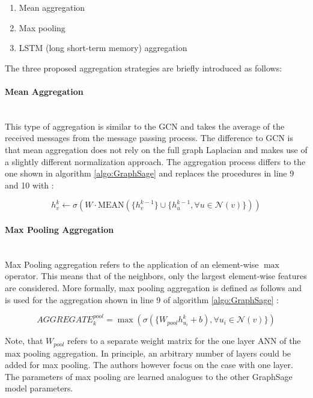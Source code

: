 	\begin{enumerate}
		\setlength\itemsep{0.2em}
		\item Mean aggregation
		\item Max pooling
		\item LSTM (long short-term memory) aggregation
	\end{enumerate}

	\noindent The three proposed aggregation strategies are briefly introduced
	as follows:

	\paragraph{Mean Aggregation} \mbox{}\\
	\noindent This type of aggregation is similar to the GCN and takes the
	average of the received messages from the message passing process. The 
	difference to GCN is that mean aggregation does not rely on the full graph 
	Laplacian and makes use of a slightly different normalization approach. The 
	aggregation process differs to the one shown in algorithm 
	\ref{algo:GraphSage} and replaces the procedures in line 9 and 10 with 
	\citep[p. 5]{hamilton2017inductive}:

	\begin{equation}
		h_{v}^{k} \leftarrow \sigma\left(W\cdot
		\text{MEAN}(\{h_{v}^{k-1}\}\cup\{h_{u}^{k-1},\forall u \in \mathcal{N}(v)\})\right)
	\end{equation}

	\paragraph{Max Pooling Aggregation} \mbox{}\\
	\noindent Max Pooling aggregation refers to the application of an 
	element-wise $\max$ operator. This means 
	that of the neighbors, only the largest element-wise features are considered. 
	More formally, max pooling aggregation is defined as follows and is used for the
	aggregation shown in line 9 of algorithm \ref{algo:GraphSage} 
	\citep[p. 6]{hamilton2017inductive}:

	\begin{equation}
		AGGREGATE_{k}^{pool} = \max\left(\sigma(\{W_{pool}h_{u_{i}}^{k} +
		b),\forall u_{i} \in \mathcal{N}(v)\}\right)
	\end{equation}

	\noindent Note, that $W_{pool}$ refers to a separate weight matrix for the 
	one layer ANN of the max pooling aggregation. In principle, an arbitrary 
	number of layers could be added for max pooling. The authors 
	\cite{hamilton2017inductive} however focus on the case with one layer. The
	parameters of max pooling are learned analogues to the other GraphSage
	model parameters. \\ 

